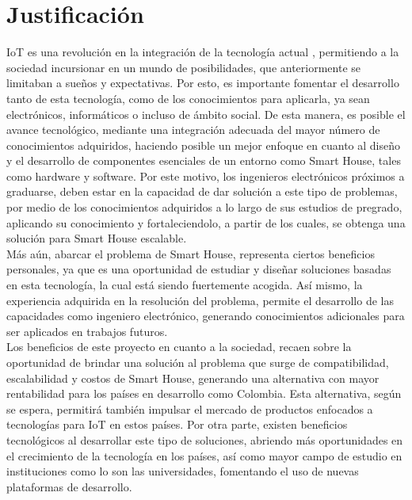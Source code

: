 \chapter{Justificación}

IoT es una revolución en la integración de la tecnología actual \cite{IdT}, permitiendo a la sociedad incursionar en un mundo de posibilidades, que anteriormente se limitaban a  sueños y expectativas. Por esto, es importante fomentar el desarrollo tanto de esta tecnología, como de los conocimientos para aplicarla, ya sean electrónicos, informáticos o incluso de ámbito social. De esta manera, es posible el avance tecnológico, mediante una integración adecuada del mayor número de conocimientos adquiridos, haciendo posible un mejor enfoque en cuanto al diseño y el desarrollo de componentes esenciales de un entorno como Smart House, tales como hardware y software. Por este motivo, los ingenieros electrónicos próximos a graduarse, deben estar en la capacidad de dar solución a este tipo de problemas, por medio de los conocimientos adquiridos a lo largo de sus estudios de pregrado, aplicando su conocimiento y fortaleciendolo, a partir de los cuales, se obtenga una solución para Smart House escalable. \\

Más aún, abarcar el problema de Smart House, representa ciertos beneficios personales, ya que es una oportunidad de estudiar y diseñar soluciones basadas en esta tecnología, la cual está siendo fuertemente acogida. Así mismo, la experiencia adquirida en la resolución del problema, permite el desarrollo de las capacidades como ingeniero electrónico, generando conocimientos adicionales para ser aplicados en trabajos futuros.\\

Los beneficios de este proyecto en cuanto a la sociedad, recaen sobre la oportunidad de brindar una solución al problema que surge de compatibilidad, escalabilidad y costos de Smart House, generando una alternativa con mayor rentabilidad para los países en desarrollo como Colombia. Esta alternativa, según se espera, permitirá también impulsar el mercado de productos enfocados a tecnologías para IoT en estos países. Por otra parte, existen beneficios tecnológicos al desarrollar este tipo de soluciones, abriendo más oportunidades en el crecimiento de la tecnología en los países, así como mayor campo de estudio en instituciones como lo son las universidades, fomentando el uso de nuevas plataformas de desarrollo.\\
